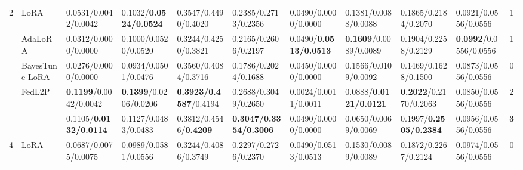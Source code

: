 \begin{table*}[t]
\begin{scriptsize}
{\begin{tabular}{c|l|l|l|l|l|l|l|l|l|c}
\multirow{5}{*}{2}  & LoRA                                   & 0.0531/0.0042/0.0042             & 0.1032/\textbf{0.0524/0.0524}            & 0.3547/0.4490/0.4020               & 0.2385/0.2713/0.2356             & 0.0490/0.0000/0.0000                    & 0.1381/0.0088/0.0088             & 0.1865/0.2184/0.2070              & 0.0921/0.0556/0.0556             & 1             \\ %
                    & AdaLoRA                              & 0.0312/0.0000/0.0000                   & 0.1000/0.0520/0.0520                  & 0.3244/0.4250/0.3821              & 0.2165/0.2606/0.2197             & 0.0490/\textbf{0.0513/0.0513}              & \textbf{0.1609}/0.0089/0.0089    & 0.1904/0.2258/0.2129             & \textbf{0.0992}/0.0556/0.0556    & 1             \\ %
                    & BayesTune-LoRA                            & 0.0276/0.0000/0.0000                   & 0.0934/0.0501/0.0476             & 0.3560/0.4084/0.3716              & 0.1786/0.2024/0.1688             & 0.0450/0.0000/0.0000                    & 0.1566/0.0109/0.0092             & 0.1469/0.1628/0.1500               & 0.0873/0.0556/0.0556             & 0             \\ %
                    & FedL2P                               & \textbf{0.1199}/0.0042/0.0042    & \textbf{0.1399}/0.0206/0.0206    & \textbf{0.3923/0.4587}/0.4194    & 0.2688/0.3049/0.2650              & 0.0024/0.0011/0.0011             & 0.0888/\textbf{0.0121/0.0121}             & \textbf{0.2022}/0.2170/0.2063     & 0.0850/0.0556/0.0556              & 2             \\ %
                    & \method{}                                 & 0.1105/\textbf{0.0132/0.0114}             & 0.1127/0.0483/0.0483             & 0.3812/0.4546/\textbf{0.4209}             & \textbf{0.3047/0.3354/0.3006}    & 0.0490/0.0000/0.0000                    & 0.0650/0.0069/0.0069              & 0.1997/\textbf{0.2505/0.2384}             & 0.0956/0.0556/0.0556             & \textbf{3}    \\ \hline
\multirow{5}{*}{4}  & LoRA                                   & 0.0687/0.0075/0.0075             & 0.0989/0.0581/0.0556             & 0.3244/0.4086/0.3749             & 0.2297/0.2726/0.2370              & 0.0490/0.0513/0.0513              & 0.1530/0.0089/0.0089              & 0.1872/0.2267/0.2124             & 0.0974/0.0556/0.0556             & 0             \\ %

\end{tabular}}
\end{scriptsize}
\end{table*}
